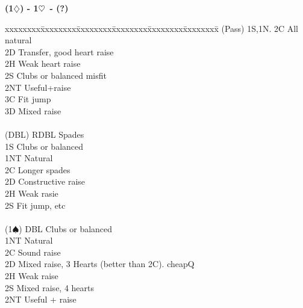 \documentclass[10pt]{article}
\renewcommand{\d}{$\diamondsuit$}
\newcommand{\h}{$\heartsuit$}
\newcommand{\s}{$\spadesuit$}
\newcommand{\x}{DBL}
\newenvironment{bidtable}[1][]
{\textbf{#1}
  \begin{adjustwidth}{1em}{}
    \addvspace{2pt}
    \begin{tabbing}
      xxxxxxxx\=xxxxxxxx\=xxxxxxxx\=xxxxxxxx\=xxxxxxxx\=xxxxxxxx\=\kill}
{\end{tabbing}\end{adjustwidth}\bigskip}%
\begin{document}
\begin{multicols*}{2}
\begin{bidtable}[(1\d) - 1\h\ - (?)]
(Pass) \> 1S,1N. \> 2C All natural                                   \\
       \> 2D     \> Transfer, good heart raise                       \\
       \> 2H     \> Weak heart raise                                 \\
       \> 2S     \> Clubs or balanced misfit                         \\
       \> 2NT    \> Useful+raise                                     \\
       \> 3C     \> Fit jump                                         \\
       \> 3D     \> Mixed raise                                      \\
                                                                     \\
(\x)   \> RDBL   \> Spades                                           \\
       \> 1S     \> Clubs or balanced                                \\
       \> 1NT    \> Natural                                          \\
       \> 2C     \> Longer spades                                    \\
       \> 2D     \> Constructive raise                               \\
       \> 2H     \> Weak rasie                                       \\
       \> 2S     \> Fit jump, etc                                    \\
                                                                     \\
(1\s)  \> DBL    \> Clubs or balanced                                \\
       \> 1NT    \> Natural                                          \\
       \> 2C     \> Sound raise                                      \\
       \> 2D     \> Mixed raise, 3  Hearts  (better than 2C). cheapQ \\
       \> 2H     \> Weak raise                                       \\
       \> 2S     \> Mixed raise, 4 hearts                            \\
       \> 2NT    \> Useful + raise                                   \\

\end{bidtable}
\end{multicols*}
\end{document}
